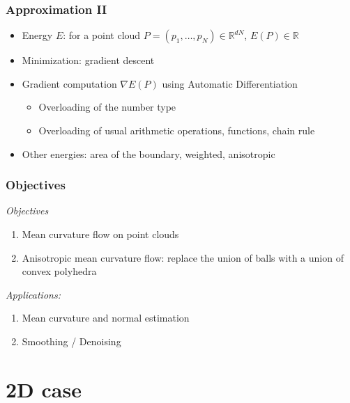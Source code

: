 \documentclass{beamer}
\newcommand{\R}{\mathbb{R}}
\begin{document}
\begin{frame}
    \frametitle{Approximation II}

    \begin{itemize}
        \item Energy $ E $: for a point cloud $ P = (p_1, \ldots,
            p_N) \in \R^{dN} $, $ E(P) \in \R $
        \item Minimization: gradient descent
        \item Gradient computation $ \nabla E(P) $ using Automatic Differentiation
            \begin{itemize}
                \item Overloading of the number type
                \item Overloading of usual arithmetic operations, functions, chain rule
            \end{itemize}
        \item Other energies: area of the boundary, weighted, anisotropic
    \end{itemize}
\end{frame}

\begin{frame}
    \frametitle{Objectives}

    \emph{Objectives}
    \begin{enumerate}
        \item Mean curvature flow on point clouds
        \item Anisotropic mean curvature flow: replace the union of balls with a
            union of convex polyhedra
    \end{enumerate}

    \emph{Applications:}
    \begin{enumerate}
        \item Mean curvature and normal estimation
        \item Smoothing / Denoising
    \end{enumerate}
\end{frame}

\section{2D case}
\end{document}
